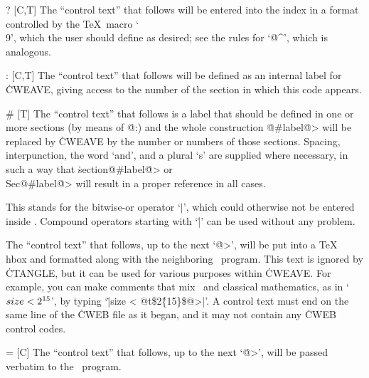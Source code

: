 \@? [C,T] The ``control text'' that follows will be entered into the index
in a format controlled by the \TeX\ macro `\.{\\9}', which the user
should define as desired; see the rules for `\.{@\^}', which is analogous.

\@: [C,T] The ``control text'' that follows will be defined as an internal
label for \.{CWEAVE}, giving access to the number of the section in which
this code appears.

\@\# [T] The ``control text'' that follows is a label that should be defined
in one or more sections (by means of \.{@:}) and the whole construction
\.{@\#}label\.{@>} will be replaced by \.{CWEAVE} by the number or numbers
of those sections. Spacing, interpunction, the word `and', and a plural `s'
are supplied where necessary, in such a way that \.{section@\#}label\.{@>} or
\.{\\Sec@\#}label\.{@>} will result in a proper reference in all cases.

\@v [C] This stands for the bitwise-or operator `$|$', which could otherwise
not be entered inside \pb. Compound operators starting with `\.|' can be
used without any problem.

\@t [C] The ``control text'' that follows, up to the next `\.{@>}', will
be put into a \TeX\ \.{\\hbox} and formatted along with the neighboring
\Cee\ program. This text is ignored by \.{CTANGLE}, but it can be used
for various purposes within \.{CWEAVE}. For example, you can make comments
that mix \Cee\ and classical mathematics, as in `$\\{size}<2^{15}$', by
typing `\.{|size < @t\$2\^\{15\}\$@>|}'.  A control text must end on the
same line of the \.{CWEB} file as it began, and it may not contain any
\.{CWEB} control codes.

\@= [C] The ``control text'' that follows, up to the next `\.{@>}', will
be passed verbatim to the \Cee\ program.


